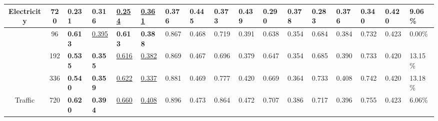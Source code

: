 \documentclass{article}
\begin{document}
\begin{table*}[h]
{\begin{tabular}{ccllllllllllllll|l}
\multicolumn{1}{c|}{\multirow{-4}{*}{Electricity}}                                             & 720 & \textbf{0.231}                     & \textbf{0.316}                    & {\color[RGB]{0, 100, 148} \underline{0.254}} & {\color[RGB]{0, 100, 148} \underline{0.361}}  &  0.376 & 0.445 & 0.373                   & 0.439                   & 0.290                   & 0.378                   & 0.283                   & 0.376                   & 0.340                    & 0.420                     & {\color[RGB]{230, 57, 70} 9.06\%}    \\ \hline
\multicolumn{1}{c|}{}                                                                          & 96  &        \textbf{0.613}                            &   {\color[RGB]{0, 100, 148} \underline{0.395}}                                & \textbf{0.613} & \textbf{0.388}  & 0.867 &  0.468 & 0.719                   & 0.391                   & 0.638                   & 0.354                   & 0.684                   & 0.384                   & 0.732                    & 0.423                     & {\color[RGB]{230, 57, 70} 0.00\%}          \\
\multicolumn{1}{c|}{}                                                                          & 192 &          \textbf{0.535}                         &      \textbf{0.355}                             & {\color[RGB]{0, 100, 148} \underline{0.616}} & {\color[RGB]{0, 100, 148} \underline{0.382}}  &  0.869&  0.467 & 0.696                   & 0.379                   & 0.647                   & 0.354                   & 0.685                   & 0.390                   & 0.733                    & 0.420                     & {\color[RGB]{230, 57, 70} 13.15\%}          \\
\multicolumn{1}{c|}{}                                                                          & 336 &                   \textbf{0.540}                 &        \textbf{0.359}                           & {\color[RGB]{0, 100, 148} \underline{0.622}} & {\color[RGB]{0, 100, 148} \underline{0.337}}  &  0.881& 0.469& 0.777                   & 0.420                   & 0.669                   & 0.364                   & 0.733                   & 0.408                   & 0.742                    & 0.420                     & {\color[RGB]{230, 57, 70}13.18\% }          \\
\multicolumn{1}{c|}{\multirow{-4}{*}{Traffic}}                                                 & 720 &\textbf{0.620 }                       &        \textbf{0.394 }                        & {\color[RGB]{0, 100, 148} \underline{0.660}} & {\color[RGB]{0, 100, 148} \underline{0.408}}  &  0.896 & 0.473 & 0.864                   & 0.472                    & 0.707                   & 0.386                   & 0.717                   & 0.396                   & 0.755                    & 0.423                     & {\color[RGB]{230, 57, 70}6.06\%}          \\ \hline

\end{tabular}}
\end{table*}
\end{document}
